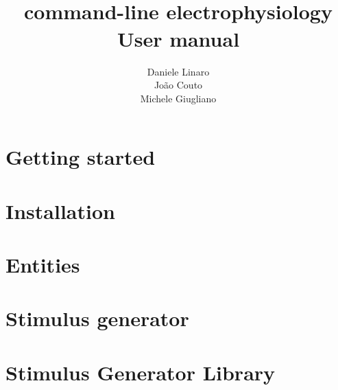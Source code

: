 \documentclass[10pt,a4paper,twoside]{book}
\title{\textbf{\progname} \\ command-line electrophysiology \\ User manual}
\author{Daniele Linaro \\ Jo\~ao Couto \\ Michele Giugliano}
\date{}
\begin{document}
\maketitle
\thispagestyle{empty}

\tableofcontents
\newpage
{}
\chapter{Getting started}
\label{chapter:start}


\chapter{Installation}
\label{chapter:install}



\chapter{Entities}
\label{chapter:entities}

\chapter{Stimulus generator}
\label{chapter:stimgen}



\appendix
\chapter{Stimulus Generator Library}

\end{document}
